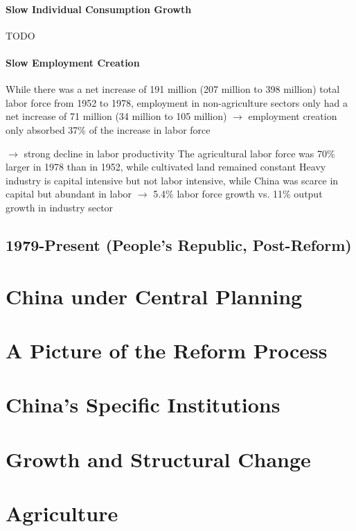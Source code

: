 \documentclass[11pt]{article}
\theoremstyle{definition}
\theoremstyle{remark}
\begin{document}
\paragraph{Slow Individual Consumption Growth}
TODO

\paragraph{Slow Employment Creation}
While there was a net increase of 191 million (207 million to 398 million) total labor force from 1952 to 1978, employment in non-agriculture sectors only had a net increase of 71 million (34 million to 105 million) $\to$ employment creation only absorbed 37\% of the increase in labor force
\begin{outline}[enumerate] $\to$ strong decline in labor productivity
\1 The agricultural labor force was 70\% larger in 1978 than in 1952, while cultivated land remained constant
\1 Heavy industry is capital intensive but not labor intensive, while China was scarce in capital but abundant in labor $\to$ 5.4\% labor force growth vs. 11\% output growth in industry sector
\end{outline}

\subsection{1979-Present (People's Republic, Post-Reform)}

\section{China under Central Planning}

\section{A Picture of the Reform Process}

\section{China's Specific Institutions}

\section{Growth and Structural Change}

\section{Agriculture}
\end{document}
